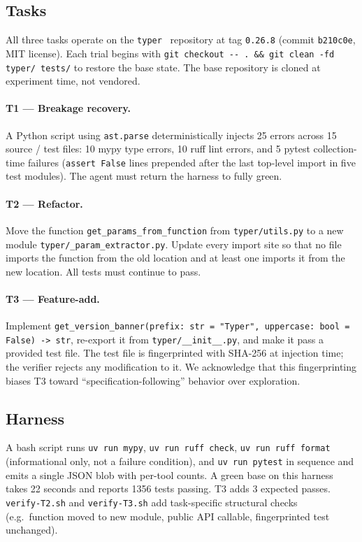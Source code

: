 \documentclass[11pt,a4paper]{article}
\begin{document}
\subsection{Tasks}

All three tasks operate on the \texttt{typer}~\citep{ramirez2024typer} repository at tag \texttt{0.26.8} (commit \texttt{b210c0e}, MIT license). Each trial begins with \verb|git checkout -- . && git clean -fd typer/ tests/| to restore the base state. The base repository is cloned at experiment time, not vendored.

\paragraph{T1 --- Breakage recovery.}
A Python script using \texttt{ast.parse} deterministically injects 25 errors across 15 source / test files: 10 mypy type errors, 10 ruff lint errors, and 5 pytest collection-time failures (\texttt{assert False} lines prepended after the last top-level import in five test modules). The agent must return the harness to fully green.

\paragraph{T2 --- Refactor.}
Move the function \texttt{get\_params\_from\_function} from \texttt{typer/utils.py} to a new module \texttt{typer/\_param\_extractor.py}. Update every import site so that no file imports the function from the old location and at least one imports it from the new location. All tests must continue to pass.

\paragraph{T3 --- Feature-add.}
Implement \texttt{get\_version\_banner(prefix: str = "Typer", uppercase: bool = False) -> str}, re-export it from \texttt{typer/\_\_init\_\_.py}, and make it pass a provided test file. The test file is fingerprinted with SHA-256 at injection time; the verifier rejects any modification to it. We acknowledge that this fingerprinting biases T3 toward ``specification-following'' behavior over exploration.

\subsection{Harness}

A bash script runs \texttt{uv run mypy}, \texttt{uv run ruff check}, \texttt{uv run ruff format} (informational only, not a failure condition), and \texttt{uv run pytest} in sequence and emits a single JSON blob with per-tool counts. A green base on this harness takes 22 seconds and reports 1356 tests passing. T3 adds 3 expected passes. \texttt{verify-T2.sh} and \texttt{verify-T3.sh} add task-specific structural checks (e.g.\ function moved to new module, public API callable, fingerprinted test unchanged).
\end{document}
